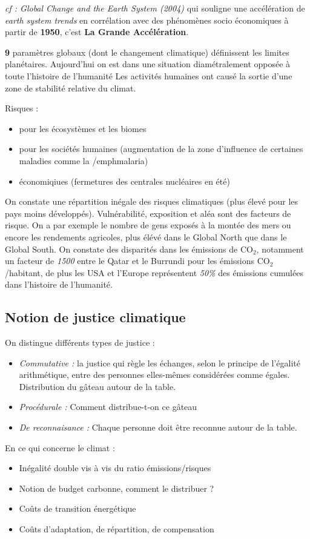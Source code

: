 \documentclass {article}
\newcommand{\V}[0]{\vspace{1\baselineskip}}
\begin{document}
\textit{cf : Global Change and the Earth System (2004)} qui souligne une accélération de \emph{earth system trends} en corrélation avec des phénomènes socio économiques à partir de \textbf{1950}, c'est \textbf{La Grande Accélération}.

\textbf{9} paramètres globaux (dont le changement climatique) définissent les limites planétaires.
Aujourd'hui on est dans une situation diamétralement opposée à toute l'histoire de l'humanité
Les activités humaines ont causé la sortie d'une zone de stabilité relative du climat.
\V

Risques :
\begin{itemize}
\item pour les écosystèmes et les biomes
\item pour les sociétés humaines (augmentation de la zone d'influence de certaines maladies comme la /emph{malaria})
\item économiqiues (fermetures des centrales nucléaires en été)
\end{itemize}
\V

On constate une répartition inégale des risques climatiques (plus élevé pour les pays moins développés). Vulnérabilité, exposition et aléa sont des facteurs de risque.
On a par exemple le nombre de gens exposés à la montée des mers ou encore les rendements agricoles, plus élévé dans le Global North que dans le Global South.
On constate des disparités dans les émissions de CO$_2$, notamment un facteur de \emph{1500} entre le Qatar et le Burrundi pour les émissions CO$_2$/habitant, de plus les USA et l'Europe représentent \emph{50\%} des émissions cumulées dans l'histoire de l'humanité.
\bigskip
\subsection{Notion de justice climatique}
\bigskip
On distingue différents types de justice :
\begin{itemize}
\item \textit{Commutative :} la justice qui règle les échanges, selon le principe de l'égalité arithmétique, entre des personnes elles-mêmes considérées comme égales.
Distribution du gâteau autour de la table.
\item \textit{Procédurale :} Comment distribue-t-on ce gâteau
\item \textit{De reconnaisance :} Chaque personne doit être reconnue autour de la table.
\end{itemize}
\V
En ce qui concerne le climat :
\begin{itemize}
\item Inégalité double vis à vis du ratio émissions/risques
\item Notion de budget carbonne, comment le distribuer ?
\item Coûts de transition énergétique
\item Coûts d'adaptation, de répartition, de compensation
\end{itemize}
\V
\end{document}
